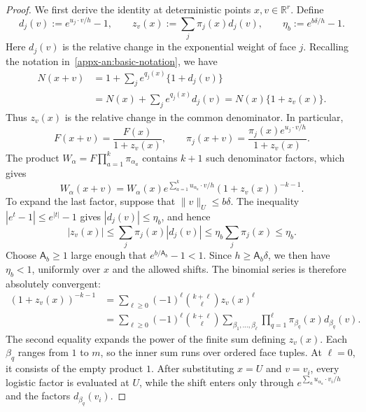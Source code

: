 \documentclass[11pt,letterpaper]{article}
\theoremstyle{remark}
\newcommand{\R}{\mathbb R}
\begin{document}
\begin{proof}
We first derive the identity at deterministic points
$x,v\in\R^r$. Define
\[
 d_j(v):=e^{u_j\cdot v/h}-1,\qquad
 z_v(x):=\sum_j\pi_j(x)d_j(v),\qquad
 \eta_b:=e^{b\delta/h}-1.
\]
Here $d_j(v)$ is the relative change in the exponential weight
of face $j$. Recalling the notation
in~\eqref{appx-an:basic-notation}, we have
\[
 \begin{aligned}
 N(x+v)
 &=1+\sum_j e^{q_j(x)}\{1+d_j(v)\}\\
 &=N(x)+\sum_j e^{q_j(x)}d_j(v)
 =N(x)\{1+z_v(x)\}.
 \end{aligned}
\]
Thus $z_v(x)$ is the relative change in the common denominator.
In particular,
\[
 F(x+v)=\frac{F(x)}{1+z_v(x)},\qquad
 \pi_j(x+v)=\frac{\pi_j(x)e^{u_j\cdot v/h}}{1+z_v(x)}.
\]
The product $W_\alpha=F\prod_{a=1}^k\pi_{\alpha_a}$ contains
$k+1$ such denominator factors, which gives
\begin{equation}
 W_\alpha(x+v)=W_\alpha(x)
 e^{\sum_{a=1}^k u_{\alpha_a}\cdot v/h}
 (1+z_v(x))^{-k-1}.
 \label{eq:weight-translation}
\end{equation}
To expand the last factor, suppose that $\|v\|_U\le b\delta$.
The inequality $|e^t-1|\le e^{|t|}-1$ gives
$|d_j(v)|\le\eta_b$, and hence
\[
 |z_v(x)|\le\sum_j\pi_j(x)|d_j(v)|
             \le\eta_b\sum_j\pi_j(x)\le\eta_b.
\]
Choose $\mathsf A_b\ge1$ large enough that
$e^{b/\mathsf A_b}-1<1$. Since $h\ge\mathsf A_b\delta$,
we then have $\eta_b<1$, uniformly over $x$ and the allowed
shifts. The binomial series is therefore absolutely convergent:
\[
 \begin{aligned}
 (1+z_v(x))^{-k-1}
 &=\sum_{\ell\ge0}(-1)^\ell\binom{k+\ell}{\ell}z_v(x)^\ell\\
 &=\sum_{\ell\ge0}(-1)^\ell\binom{k+\ell}{\ell}
       \sum_{\beta_1,\ldots,\beta_\ell}
       \prod_{q=1}^\ell\pi_{\beta_q}(x)d_{\beta_q}(v).
 \end{aligned}
\]
The second equality expands the power of the finite sum defining
$z_v(x)$. Each $\beta_q$ ranges from $1$ to $m$, so the inner
sum runs over ordered face tuples. At $\ell=0$, it consists of
the empty product $1$. After substituting $x=U$ and $v=v_i$,
every logistic factor is evaluated at $U$, while the shift enters
only through $e^{\sum_a u_{\alpha_a}\cdot v_i/h}$ and the
factors $d_{\beta_q}(v_i)$.


\end{proof}
\end{document}

